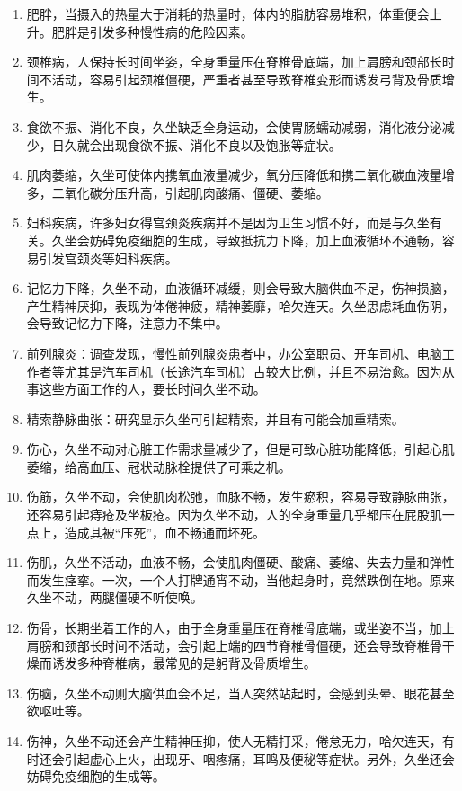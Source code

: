\documentclass{ctexart}
\begin{document}
\begin{enumerate}
    \item 肥胖，当摄入的热量大于消耗的热量时，体内的脂肪容易堆积，体重便会上升。肥胖是引发多种慢性病的危险因素。
    \item 颈椎病，人保持长时间坐姿，全身重量压在脊椎骨底端，加上肩膀和颈部长时间不活动，容易引起颈椎僵硬，严重者甚至导致脊椎变形而诱发弓背及骨质增生。
    \item 食欲不振、消化不良，久坐缺乏全身运动，会使胃肠蠕动减弱，消化液分泌减少，日久就会出现食欲不振、消化不良以及饱胀等症状。
    \item 肌肉萎缩，久坐可使体内携氧血液量减少，氧分压降低和携二氧化碳血液量增多，二氧化碳分压升高，引起肌肉酸痛、僵硬、萎缩。
    \item 妇科疾病，许多妇女得宫颈炎疾病并不是因为卫生习惯不好，而是与久坐有关。久坐会妨碍免疫细胞的生成，导致抵抗力下降，加上血液循环不通畅，容易引发宫颈炎等妇科疾病。
    \item 记忆力下降，久坐不动，血液循环减缓，则会导致大脑供血不足，伤神损脑，产生精神厌抑，表现为体倦神疲，精神萎靡，哈欠连天。久坐思虑耗血伤阴，会导致记忆力下降，注意力不集中。
    \item 前列腺炎：调查发现，慢性前列腺炎患者中，办公室职员、开车司机、电脑工作者等尤其是汽车司机（长途汽车司机）占较大比例，并且不易治愈。因为从事这些方面工作的人，要长时间久坐不动。
    \item 精索静脉曲张：研究显示久坐可引起精索，并且有可能会加重精索。
    \item 伤心，久坐不动对心脏工作需求量减少了，但是可致心脏功能降低，引起心肌萎缩，给高血压、冠状动脉栓提供了可乘之机。
    \item 伤筋，久坐不动，会使肌肉松弛，血脉不畅，发生瘀积，容易导致静脉曲张，还容易引起痔疮及坐板疮。因为久坐不动，人的全身重量几乎都压在屁股肌一点上，造成其被“压死”，血不畅通而坏死。
    \item 伤肌，久坐不活动，血液不畅，会使肌肉僵硬、酸痛、萎缩、失去力量和弹性而发生痉挛。一次，一个人打牌通宵不动，当他起身时，竟然跌倒在地。原来久坐不动，两腿僵硬不听使唤。
    \item 伤骨，长期坐着工作的人，由于全身重量压在脊椎骨底端，或坐姿不当，加上肩膀和颈部长时间不活动，会引起上端的四节脊椎骨僵硬，还会导致脊椎骨干燥而诱发多种脊椎病，最常见的是躬背及骨质增生。
    \item 伤脑，久坐不动则大脑供血会不足，当人突然站起时，会感到头晕、眼花甚至欲呕吐等。
    \item 伤神，久坐不动还会产生精神压抑，使人无精打采，倦怠无力，哈欠连天，有时还会引起虚心上火，出现牙、咽疼痛，耳鸣及便秘等症状。另外，久坐还会妨碍免疫细胞的生成等。

\end{enumerate}
\end{document}
